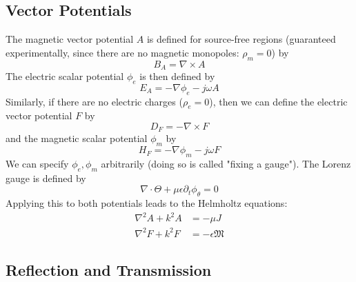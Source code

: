 \documentclass{article}
\numberwithin{equation}{section}
\begin{document}
        \subsection{Vector Potentials}
            The magnetic vector potential $A$ is defined for source-free regions
            (guaranteed experimentally, since there are no magnetic monopoles: $\rho_m =
            0$) by
            \begin{equation} \label{eq:magneticVectorPotential}
                B_A = \nabla \times A 
            \end{equation}
            The electric scalar potential $\phi_e$ is then defined by
            \begin{equation} \label{eq:electricScalarPotential}
                E_A = - \nabla \phi_e -j \omega A 
            \end{equation}
            Similarly, if there are no electric charges ($\rho_e = 0$), then we can
            define the electric vector potential $F$ by
            \begin{equation} \label{eq:electricVectorPotential}
                D_F = - \nabla \times F 
            \end{equation}
            and the magnetic scalar potential $\phi_m$ by
            \begin{equation} \label{eq:magneticScalarPotential}
                H_F = - \nabla \phi_m -j \omega F 
            \end{equation}
            We can specify $\phi_e, \phi_m$ arbitrarily (doing so is called "fixing a
            gauge"). The Lorenz gauge is defined by
            \begin{equation} \label{eq:LorenzGauge}
                \nabla \cdot \Theta + \mu \epsilon \partial_t \phi_{\theta} = 0 
            \end{equation}
            Applying this to both potentials leads to the Helmholtz equations:
            \begin{subequations} \label{eq:Helmholtz}
                \begin{align}
                    \nabla^2 A + k^2 A &= -\mu J \label{eq:HelmMag} \\
                    \nabla^2 F + k^2 F &= -\epsilon \mathfrak{M} \label{eq:HelmElec}
                \end{align}
            \end{subequations}
        \subsection{Reflection and Transmission}
\end{document}
